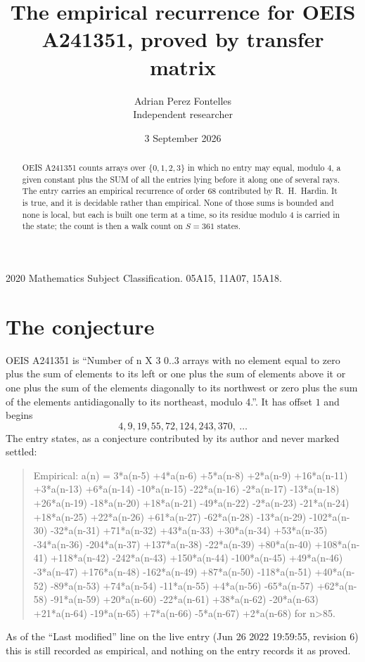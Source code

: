 \documentclass[11pt,a4paper]{article}
\title{The empirical recurrence for OEIS A241351, proved by transfer matrix}
\author{Adrian Perez Fontelles\\ \small Independent researcher}
\date{3 September 2026}
\theoremstyle{plain}
\theoremstyle{definition}
\begin{document}
\maketitle

\begin{abstract}
OEIS A241351 counts arrays over $\{0,1,2,3\}$ in which no entry may equal, modulo $4$, a given
constant plus the SUM of all the entries lying before it along one of several rays. The entry
carries an empirical recurrence of order $68$ contributed by R.~H.~Hardin. It is true, and
it is decidable rather than empirical. None of those sums is bounded and none is local, but
each is built one term at a time, so its residue modulo $4$ is carried in the state; the
count is then a walk count on $S=361$ states.
\end{abstract}

\noindent\small 2020 Mathematics Subject Classification. 05A15, 11A07, 15A18.\normalsize

\section{The conjecture}

OEIS A241351 is ``Number of n X 3 0..3 arrays with no element equal to zero plus the sum of elements to its left or one plus the sum of elements above it or one plus the sum of the elements diagonally to its northwest or zero plus the sum of the elements antidiagonally to its northeast, modulo 4.''. It has offset $1$ and begins
\[
4, 9, 19, 55, 72, 124, 243, 370,\ \dots
\]
The entry states, as a conjecture contributed by its author and never marked settled:
\begin{quote}
Empirical: a(n) = 3*a(n-5) +4*a(n-6) +5*a(n-8) +2*a(n-9) +16*a(n-11) +3*a(n-13) +6*a(n-14) -10*a(n-15) -22*a(n-16) -2*a(n-17) -13*a(n-18) +26*a(n-19) -18*a(n-20) +18*a(n-21) -49*a(n-22) -2*a(n-23) -21*a(n-24) +18*a(n-25) +22*a(n-26) +61*a(n-27) -62*a(n-28) -13*a(n-29) -102*a(n-30) -32*a(n-31) +71*a(n-32) +43*a(n-33) +30*a(n-34) +53*a(n-35) -34*a(n-36) -204*a(n-37) +137*a(n-38) -22*a(n-39) +80*a(n-40) +108*a(n-41) +118*a(n-42) -242*a(n-43) +150*a(n-44) -100*a(n-45) +49*a(n-46) -3*a(n-47) +176*a(n-48) -162*a(n-49) +87*a(n-50) -118*a(n-51) +40*a(n-52) -89*a(n-53) +74*a(n-54) -11*a(n-55) +4*a(n-56) -65*a(n-57) +62*a(n-58) -91*a(n-59) +20*a(n-60) -22*a(n-61) +38*a(n-62) -20*a(n-63) +21*a(n-64) -19*a(n-65) +7*a(n-66) -5*a(n-67) +2*a(n-68) for n>85.
\end{quote}
As of the ``Last modified'' line on the live entry (Jun 26 2022 19:59:55, revision 6) this is still
recorded as empirical, and nothing on the entry records it as proved.
\end{document}
